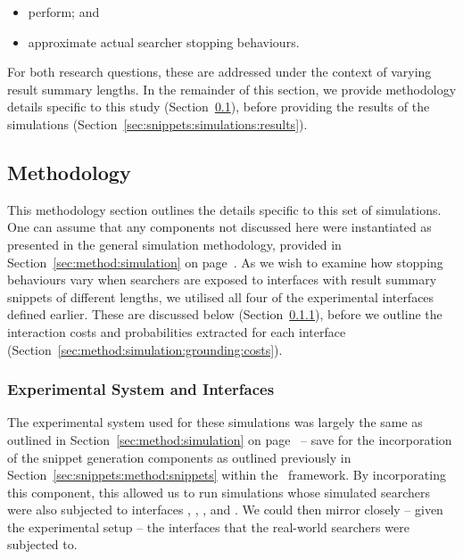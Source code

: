 \begin{itemize}
    \item{ perform; and}
    \item{ approximate actual searcher stopping behaviours.}
\end{itemize}

For both research questions, these are addressed under the context of varying result summary lengths. In the remainder of this section, we provide methodology details specific to this study (Section~\ref{sec:snippets:simulations:method}), before providing the results of the simulations (Section~\ref{sec:snippets:simulations:results}).

\subsection{Methodology}\label{sec:snippets:simulations:method}
This methodology section outlines the details specific to this set of simulations. One can assume that any components not discussed here were instantiated as presented in the general simulation methodology, provided in Section~\ref{sec:method:simulation} on page~\pageref{sec:method:simulation}. As we wish to examine how stopping behaviours vary when searchers are exposed to interfaces with result summary snippets of different lengths, we utilised all four of the experimental interfaces defined earlier. These are discussed below (Section~\ref{sec:snippets:simulations:method:interfaces}), before we outline the interaction costs and probabilities extracted for each interface (Section~\ref{sec:method:simulation:grounding:costs}).

\subsubsection{Experimental System and Interfaces}\label{sec:snippets:simulations:method:interfaces}
The experimental system used for these simulations was largely the same as outlined in Section~\ref{sec:method:simulation} on page~\pageref{sec:method:simulation} -- save for the incorporation of the snippet generation components as outlined previously in Section~\ref{sec:snippets:method:snippets} within the \simiir~framework. By incorporating this component, this allowed us to run simulations whose simulated searchers were also subjected to interfaces , , , and . We could then mirror closely -- given the experimental setup -- the interfaces that the real-world searchers were subjected to.

